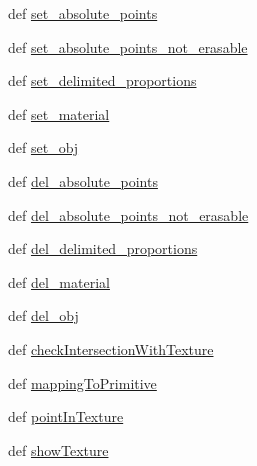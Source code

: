 \begin{DoxyCompactItemize}
\item 
def \hyperlink{classdestruction_1_1_texture_1_1_texture_a7aa362f4fa9c3ad080c8876e86d01abc}{set\-\_\-absolute\-\_\-points}
\item 
def \hyperlink{classdestruction_1_1_texture_1_1_texture_a6f51c6c04b2386b8786e796fa9b5a019}{set\-\_\-absolute\-\_\-points\-\_\-not\-\_\-erasable}
\item 
def \hyperlink{classdestruction_1_1_texture_1_1_texture_a98774b65f581bead8a911658de4d8d1d}{set\-\_\-delimited\-\_\-proportions}
\item 
def \hyperlink{classdestruction_1_1_texture_1_1_texture_a7577c5f0ee6de4435c56fa9f963a432c}{set\-\_\-material}
\item 
def \hyperlink{classdestruction_1_1_texture_1_1_texture_a299b61efde6c752614771dc4d508dad8}{set\-\_\-obj}
\item 
def \hyperlink{classdestruction_1_1_texture_1_1_texture_af519a87ec13054fa0c640157d57626e8}{del\-\_\-absolute\-\_\-points}
\item 
def \hyperlink{classdestruction_1_1_texture_1_1_texture_ae3343c554815c4eed66d44fe7d8dd249}{del\-\_\-absolute\-\_\-points\-\_\-not\-\_\-erasable}
\item 
def \hyperlink{classdestruction_1_1_texture_1_1_texture_a4afc822eb1237d9f67fdf143e864a7d2}{del\-\_\-delimited\-\_\-proportions}
\item 
def \hyperlink{classdestruction_1_1_texture_1_1_texture_a98dabc37fdecf26f376928830cc7fdfc}{del\-\_\-material}
\item 
def \hyperlink{classdestruction_1_1_texture_1_1_texture_adf7795e15e4f77f564e163f787bfdb04}{del\-\_\-obj}
\item 
def \hyperlink{classdestruction_1_1_texture_1_1_texture_a9cf1dbeccaa5f55ef538c13cca591843}{check\-Intersection\-With\-Texture}
\item 
def \hyperlink{classdestruction_1_1_texture_1_1_texture_aaf2741cc9ed283dd7ca27e2dd000ff29}{mapping\-To\-Primitive}
\item 
def \hyperlink{classdestruction_1_1_texture_1_1_texture_af8c0a74cf7c440eb475e189e7e33524c}{point\-In\-Texture}
\item 
def \hyperlink{classdestruction_1_1_texture_1_1_texture_af34741e71ec3762011eb7e60cb4bc10f}{show\-Texture}
\end{DoxyCompactItemize}
